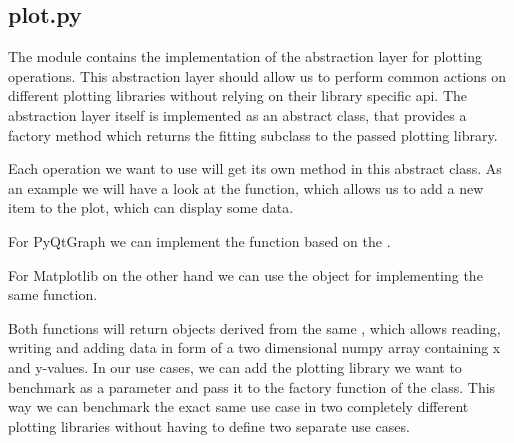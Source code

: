 \subsection{plot.py}

The module  contains the implementation
of the abstraction layer for plotting operations. This abstraction layer should
allow us to perform common actions on different plotting libraries without
relying on their library specific \gls{api}. The abstraction layer itself is
implemented as an abstract class, that provides a factory method which returns
the fitting subclass to the passed plotting library.



Each operation we want to use will get its own method in this abstract class. As
an example we will have a look at the  function,
which allows us to add a new item to the plot, which can display some data.



For PyQtGraph we can implement the  function based
on the .



For Matplotlib on the other hand we can use the 
object for implementing the same function.



Both functions will return objects derived from the same
, which allows reading, writing and adding
data in form of a two dimensional numpy array containing x and y-values. In our
use cases, we can add the plotting library we want to benchmark as a parameter
and pass it to the factory function  of the
 class. This way we can benchmark the exact
same use case in two completely different plotting libraries without having to
define two separate use cases.





